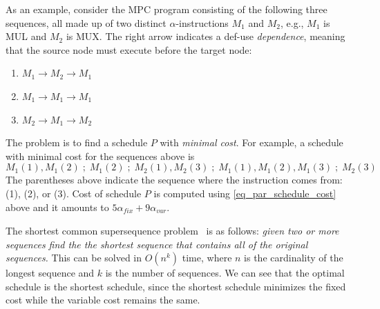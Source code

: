 As an example, consider the MPC program consisting of the following three sequences, all made up of two distinct $\alpha$-instructions $M_1$ and $M_2$, e.g., $M_1$ is MUL and $M_2$ is MUX. The right arrow indicates a def-use \emph{dependence}, meaning that the source node must execute before the target node: 

\begin{enumerate}
    \item $M_1 \rightarrow M_2 \rightarrow M_1$
    \item $M_1 \rightarrow M_1 \rightarrow M_1$
    \item $M_2 \rightarrow M_1 \rightarrow M_2$
\end{enumerate} 





The problem is to find a schedule $P$ with \emph{minimal cost}. For example, a schedule with minimal cost for the sequences above is 
\[ 
M_1(1), M_1(2) \; ;\; M_1(2) \; ; \; M_2(1), M_2(3) \; ; \; M_1(1), M_1(2), M_1(3) \; ; \;  M_2(3)
\]
The parentheses above indicate the sequence where the instruction comes from: (1), (2), or (3). 
Cost of schedule $P$ is computed using \cref{eq_par_schedule_cost} above and it amounts to $5\alpha_\mathit{fix} + 9\alpha_\mathit{var}$.

The shortest common supersequence problem~\cite{Vazirani:2010} is as follows: {\it given two or more sequences find the the shortest sequence that contains all of the original sequences.} This can be solved in $O(n^k)$ time, where $n$ is the cardinality of the longest sequence and $k$ is the number of sequences. %
We can see that the optimal schedule is the shortest schedule, since the shortest schedule minimizes the fixed cost while the variable cost remains the same.

